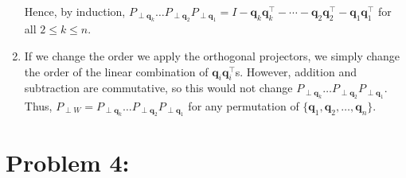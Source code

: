 \documentclass[10pt]{article}
\begin{document}
\begin{enumerate}[label=(\alph*)]
    Hence, by induction, $P_{\perp \mathbf{q}_k}\ldots P_{\perp \mathbf{q}_2}P_{\perp \mathbf{q}_1}=I-\mathbf{q}_k\mathbf{q}_k^\top-\cdots-\mathbf{q}_2\mathbf{q}_2^\top-\mathbf{q}_1\mathbf{q}_1^\top$ for all $2\le k\le n$.
    \item If we change the order we apply the orthogonal projectors, we simply change the order of the linear combination of $\mathbf{q}_i\mathbf{q}_i^\top$s. However, addition and subtraction are commutative, so this would not change $P_{\perp \mathbf{q}_k}\ldots P_{\perp \mathbf{q}_2}P_{\perp \mathbf{q}_1}$.
    Thus, $P_{\perp W}=P_{\perp \mathbf{q}_k}\ldots P_{\perp \mathbf{q}_2}P_{\perp \mathbf{q}_1}$ for any permutation of $\{\mathbf{q}_1,\mathbf{q}_2,\ldots,\mathbf{q}_n\}$.
\end{enumerate}
\section*{Problem 4:}
\end{document}
